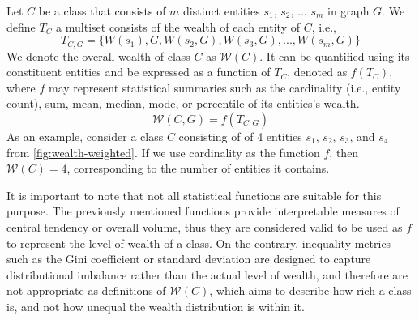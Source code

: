 Let \(C\) be a class that consists of \(m\) distinct entities \(s_1\), \(s_2\), ... \(s_m\) in graph \(G\). We define \(T_C\) a multiset consists of the wealth of each entity of \(C\), i.e., 
\[
    T_{C,G} = \{W(s_1), G, W(s_2, G), W(s_3, G), ..., W(s_m, G)\}
\] 
We denote the overall wealth of class \(C\) as \(\mathcal{W}(C)\). It can be quantified using its constituent entities and be expressed as a function of \(T_C\), denoted as \(f(T_C)\), where \(f\) may represent statistical summaries such as the cardinality (i.e., entity count), sum, mean, median, mode, or percentile of its entities's wealth.
\[
    \mathcal{W}(C,G) = f(T_{C,G})
\]
As an example, consider a class \(C\) consisting of of 4 entities  \(s_1\), \(s_2\), \(s_3\), and \(s_4\) from \autoref{fig:wealth-weighted}. If we use cardinality as the function \(f\), then \(\mathcal{W}(C) = 4\), corresponding to the number of entities it contains.

It is important to note that not all statistical functions are suitable for this purpose. The previously mentioned functions provide interpretable measures of central tendency or overall volume, thus they are considered valid to be used as \(f\) to represent the level of wealth of a class. On the contrary, inequality metrics such as the Gini coefficient or standard deviation are designed to capture distributional imbalance rather than the actual level of wealth, and therefore are not appropriate as definitions of \(\mathcal{W}(C)\), which aims to describe how rich a class is, and not how unequal the wealth distribution is within it.